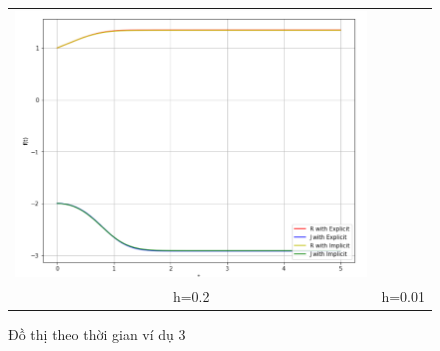 \documentclass[a4paper]{article}
\begin{document}
\begin{enumerate}
\begin{enumerate}
\begin{figure}[htp]
\begin{tabular}{cc}
        \includegraphics[scale = .58]{Images/Bt4/vd3/h=0.01.png} \\
        h=0.2 & h=0.01
    \end{tabular}
    \caption{Đồ thị theo thời gian ví dụ 3}
\end{figure}


\end{enumerate}
\end{enumerate}
\end{document}
